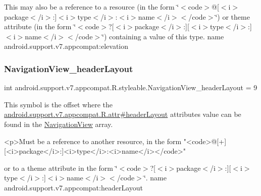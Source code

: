 This may also be a reference to a resource (in the form \char`\"{}$<$code$>$@\mbox{[}$<$i$>$package$<$/i$>$\+:\mbox{]}$<$i$>$type$<$/i$>$\+:$<$i$>$name$<$/i$>$$<$/code$>$\char`\"{}) or theme attribute (in the form \char`\"{}$<$code$>$?\mbox{[}$<$i$>$package$<$/i$>$\+:\mbox{]}\mbox{[}$<$i$>$type$<$/i$>$\+:\mbox{]}$<$i$>$name$<$/i$>$$<$/code$>$\char`\"{}) containing a value of this type.  name android.\+support.\+v7.\+appcompat\+:elevation \mbox{\label{classandroid_1_1support_1_1v7_1_1appcompat_1_1R_1_1styleable_a25d0749f6f4b3021640c947c8f4790fd}} 
\subsubsection{\texorpdfstring{Navigation\+View\+\_\+header\+Layout}{NavigationView\_headerLayout}}
{\footnotesize\ttfamily int android.\+support.\+v7.\+appcompat.\+R.\+styleable.\+Navigation\+View\+\_\+header\+Layout = 9\hspace{0.3cm}{\ttfamily [static]}}

This symbol is the offset where the \hyperlink{classandroid_1_1support_1_1v7_1_1appcompat_1_1R_1_1attr_a16960d20392c2e0215098a5eb20f48f2}{android.\+support.\+v7.\+appcompat.\+R.\+attr\#header\+Layout} attribute\textquotesingle{}s value can be found in the \hyperlink{classandroid_1_1support_1_1v7_1_1appcompat_1_1R_1_1styleable_a52cfb3ba7bdfc8fb2cca459f35c24456}{Navigation\+View} array.

\begin{DoxyVerb}      <p>Must be a reference to another resource, in the form "<code>@[+][<i>package</i>:]<i>type</i>:<i>name</i></code>"
\end{DoxyVerb}
 or to a theme attribute in the form \char`\"{}$<$code$>$?\mbox{[}$<$i$>$package$<$/i$>$\+:\mbox{]}\mbox{[}$<$i$>$type$<$/i$>$\+:\mbox{]}$<$i$>$name$<$/i$>$$<$/code$>$\char`\"{}.  name android.\+support.\+v7.\+appcompat\+:header\+Layout \mbox{\label{classandroid_1_1support_1_1v7_1_1appcompat_1_1R_1_1styleable_a245c0ec3356c0065fcc832a44ad5c26b}} 
